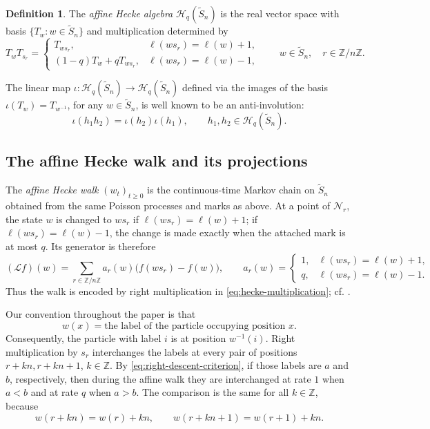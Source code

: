 \documentclass[11pt,a4paper]{amsart}
\theoremstyle{definition}
\newtheorem{definition}[theorem]{Definition}
\theoremstyle{remark}
\numberwithin{equation}{section}
\newcommand{\Z}{\mathbb Z}
\newcommand{\wtS}{\widetilde S_n}
\begin{document}
	\begin{definition}\label{def:affine-hecke-algebra}
		The \emph{affine Hecke algebra} $\mathscr H_q(\wtS)$ is the real
		vector space with basis $\{T_w:w\in\wtS\}$ and multiplication determined by
		\begin{equation}\label{eq:hecke-multiplication}
			T_wT_{s_r}=
			\begin{cases}
				T_{ws_r},&\ell(ws_r)=\ell(w)+1,\\[1mm]
				(1-q)T_w+qT_{ws_r},&\ell(ws_r)=\ell(w)-1,
			\end{cases}
			\qquad w\in\wtS,\quad r\in\Z/n\Z.
		\end{equation}
	\end{definition}
	
	The linear map $\iota: \mathscr H_q(\wtS) \to \mathscr H_q(\wtS)$ defined via the images of the basis $\iota(T_w) = T_{w^{-1}}$, for any $w \in \wtS$, is well known to be an anti-involution:
	\begin{equation}\label{eq:hecke-anti-involution}
		\iota(h_1h_2)=\iota(h_2)\iota(h_1),
		\qquad h_1,h_2\in\mathscr H_q(\wtS).
	\end{equation}
	
	\subsection{The affine Hecke walk and its projections}
	\label{subsec:affine-hecke-walk}
	
	The \emph{affine Hecke walk} $(w_t)_{t\ge0}$ is the continuous-time Markov
	chain on $\wtS$ obtained from the same Poisson processes and marks as above.  At a point of
	$\mathcal N_r$, the state $w$ is changed to $ws_r$ if
	$\ell(ws_r)=\ell(w)+1$; if $\ell(ws_r)=\ell(w)-1$, the change is made exactly
	when the attached mark is at most $q$.  Its generator is therefore
	\begin{equation}\label{eq:affine-walk-generator}
		(\mathcal L f)(w)=\sum_{r\in\Z/n\Z}a_r(w)
		\bigl(f(ws_r)-f(w)\bigr),
		\qquad
		a_r(w)=
		\begin{cases}
			1,&\ell(ws_r)=\ell(w)+1,\\
			q,&\ell(ws_r)=\ell(w)-1.
		\end{cases}
	\end{equation}
	Thus the walk is encoded by right multiplication in
	\eqref{eq:hecke-multiplication}; cf. \cite{BufetovHecke}. 
	
	Our convention throughout the paper is that
	\begin{equation}\label{eq:position-to-label-convention}
		w(x)=\text{the label of the particle occupying position }x.
	\end{equation}
	Consequently, the particle with label $i$ is at position $w^{-1}(i)$.  Right
	multiplication by $s_r$ interchanges the labels at every pair of positions
	$r+kn,r+kn+1$, $k\in\Z$.  By \eqref{eq:right-descent-criterion}, if those
	labels are $a$ and $b$, respectively, then during the affine walk they are interchanged at rate $1$
	when $a<b$ and at rate $q$ when $a>b$.  The comparison is the same for all
	$k\in\Z$, because
	\[
	w(r+kn)=w(r)+kn,
	\qquad w(r+kn+1)=w(r+1)+kn.
	\]
	
\end{document}
